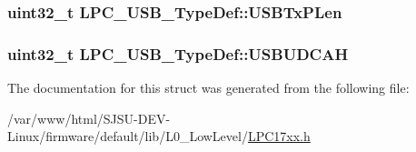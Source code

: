 \subsubsection[{\texorpdfstring{U\+S\+B\+Tx\+P\+Len}{USBTxPLen}}]{ uint32\+\_\+t L\+P\+C\+\_\+\+U\+S\+B\+\_\+\+Type\+Def\+::\+U\+S\+B\+Tx\+P\+Len}\hypertarget{structLPC__USB__TypeDef_a0b101b41d4764fd398f043d4ab3893ef}{}\label{structLPC__USB__TypeDef_a0b101b41d4764fd398f043d4ab3893ef}
\subsubsection[{\texorpdfstring{U\+S\+B\+U\+D\+C\+AH}{USBUDCAH}}]{ uint32\+\_\+t L\+P\+C\+\_\+\+U\+S\+B\+\_\+\+Type\+Def\+::\+U\+S\+B\+U\+D\+C\+AH}\hypertarget{structLPC__USB__TypeDef_a2a94993d8544189ab87c832fbd212db5}{}\label{structLPC__USB__TypeDef_a2a94993d8544189ab87c832fbd212db5}


The documentation for this struct was generated from the following file\+:\begin{DoxyCompactItemize}
\item 
/var/www/html/\+S\+J\+S\+U-\/\+D\+E\+V-\/\+Linux/firmware/default/lib/\+L0\+\_\+\+Low\+Level/\hyperlink{LPC17xx_8h}{L\+P\+C17xx.\+h}\end{DoxyCompactItemize}
